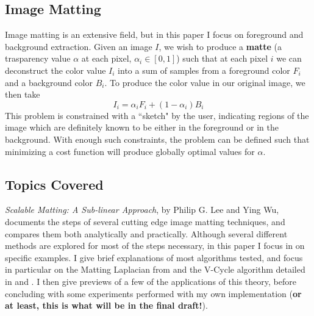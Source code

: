 \subsection{Image Matting}
Image matting is an extensive field, but in this paper I focus on foreground and background extraction. Given an image $I$, we wish to produce a \textbf{matte} (a trasparency value $\alpha$ at each pixel, $\alpha_{i}\in[0,1]$) such that at each pixel $i$ we can deconstruct the color value $I_{i}$ into a sum of samples from a foreground color $F_{i}$ and a background color $B_{i}$. To produce the color value in our original image, we then take
\[I_{i}=\alpha_{i}F_{i}+(1-\alpha_{i})B_{i}\]
This problem is constrained with a ``sketch" by the user, indicating regions of the image which are definitely known to be either in the foreground or in the background. With enough such constraints, the problem can be defined such that minimizing a cost function will produce globally optimal values for $\alpha$.
\subsection{Topics Covered}
\textit{Scalable Matting: A Sub-linear Approach}, by Philip G. Lee and Ying Wu, documents the steps of several cutting edge image matting techniques, and compares them both analytically and practically. Although several different methods are explored for most of the steps necessary, in this paper I focus in on specific examples. I give brief explanations of most algorithms tested, and focus in particular on the Matting Laplacian from \cite{levin08} and the V-Cycle algorithm detailed in \cite{briggs87} and \cite{bramble93}. I then give previews of a few of the applications of this theory, before concluding with some experiments performed with my own implementation (\textbf{or at least, this is what will be in the final draft!}).